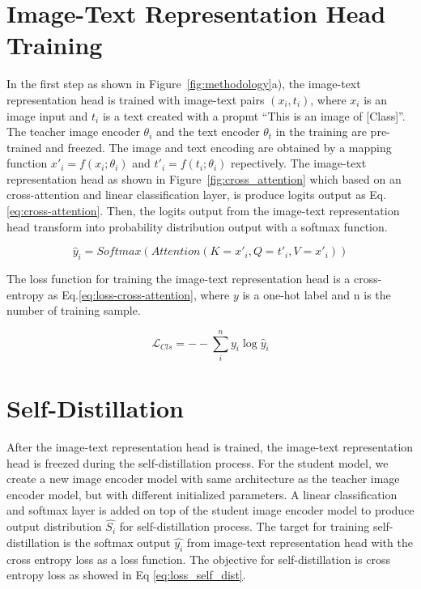 \section{Image-Text Representation Head Training}
In the first step as shown in Figure~\ref{fig:methodology}a), the image-text representation head is trained with image-text pairs $(x_i, t_i)$, where $x_i$ is an image input and $t_i$ is a text created with a propmt ``This is an image of [Class]''.
The teacher image encoder $\theta_i$ and the text encoder $\theta_t$ in the training are pre-trained and freezed.
The image and text encoding are obtained by a mapping function $x'_i = f(x_i; \theta_i)$ and $t'_i = f(t_i; \theta_i)$ repectively.
The image-text representation head as shown in Figure~\ref{fig:cross_attention} which based on an cross-attention and linear classification layer, is produce logits output as Eq.\ref{eq:cross-attention}.
Then, the logits output from the image-text representation head transform into probability distribution output with a softmax function.

\begin{equation}
    \label{eq:cross-attention}
    \hat{y}_i = Softmax(Attention(K=x'_i, Q=t'_i, V=x'_i))
\end{equation}

The loss function for training the image-text representation head is a cross-entropy as Eq.\ref{eq:loss-cross-attention}, where $y$ is a one-hot label and n is the number of training sample.

\begin{equation}
    \label{eq:loss-cross-attention}
    \mathcal{L}_{Cls} = --\sum_{i}^{n} y_i\log\hat{y}_i
\end{equation}

\section{Self-Distillation}
After the image-text representation head is trained, the image-text representation head is freezed during the self-distillation process.
For the student model, we create a new image encoder model with same architecture as the teacher image encoder model, but with different initialized parameters.
A linear classification and softmax layer is added on top of the student image encoder model to produce output distribution $\hat{S_i}$ for self-distillation process.
The target for training self-distillation is the softmax output $\hat{y_i}$ from image-text representation head with the cross entropy loss as a loss function.
The objective for self-distillation is cross entropy loss as showed in Eq \ref{eq:loss_self_dist}.

